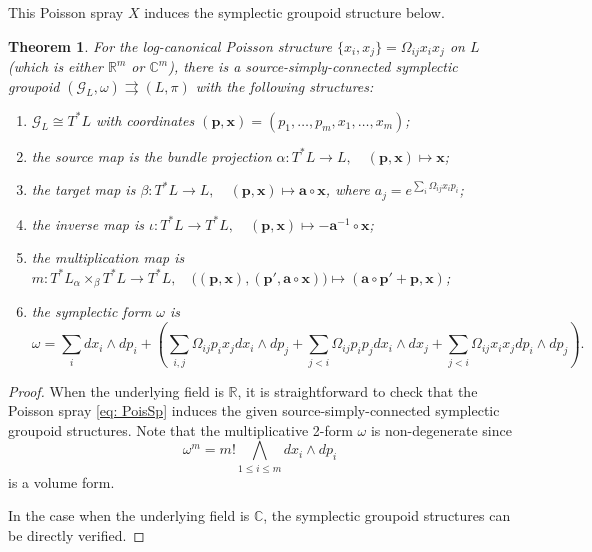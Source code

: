 \documentclass{amsart}
\newtheorem{theorem}{Theorem}[section]
\numberwithin{equation}{section}
\newcommand{\bfa}{\mathbf{a}}
\newcommand{\bfp}{\mathbf{p}}
\newcommand{\bfx}{\mathbf{x}}
\newcommand{\cG}{\mathcal{G}}
\newcommand{\CC}{\mathbb{C}}
\newcommand{\RR}{\mathbb{R}}
\newcommand{\rra}{\rightrightarrows}
\begin{document}
This Poisson spray $X$ induces the symplectic groupoid structure below.
\begin{theorem} 
  \label{thm:PoiSpLogC}
  For the log-canonical Poisson structure $\{x_i, x_j\} = \Omega_{ij} x_i x_j$ on $L$ (which is either $\RR^m$ or $\CC^m$), there is a source-simply-connected symplectic groupoid $(\cG_L, \omega) \rra (L, \pi)$ with the following structures:
  \begin{enumerate}
    \item $\cG_L \cong T^*L$ with coordinates $(\bfp, \bfx) = (p_1, \ldots, p_m, x_1, \ldots, x_m)$;
    \item the source map is the bundle projection $\alpha: T^*L \to L, \quad (\bfp, \bfx) \mapsto \bfx$;
    \item the target map is $\beta: T^*L \to L, \quad (\bfp, \bfx) \mapsto \bfa \circ \bfx$, where $a_j = e^{\sum_i \Omega_{ij} x_ip_i}$;
    \item the inverse map is $\iota: T^*L \to T^*L, \quad (\bfp, \bfx) \mapsto -\bfa^{-1}\circ \bfx$;
    \item the multiplication map is $m: T^*L {_\alpha \times_\beta} T^*L \to T^*L, \quad \big((\bfp, \bfx), (\bfp', \bfa \circ \bfx)\big) \mapsto (\bfa \circ \bfp' + \bfp, \bfx )$;
    \item the symplectic form $\omega$ is
      \begin{equation}
        \label{eq:2-formG_A}
	\omega = \sum_{i} dx_i \wedge dp_i
	  + \left(
	    \sum_{i, j} \Omega_{ij}p_ix_j dx_i \wedge dp_j 
	    + \sum_{j < i} \Omega_{ij}p_ip_j dx_i \wedge dx_j
	    + \sum_{j < i} \Omega_{ij}x_ix_j dp_i \wedge dp_j
	  \right).
      \end{equation}
  \end{enumerate}
\end{theorem}
\begin{proof}
  When the underlying field is $\RR$, it is straightforward to check that the Poisson spray \eqref{eq: PoisSp} induces the given source-simply-connected symplectic groupoid structures.
  Note that the multiplicative 2-form $\omega$ is non-degenerate since
  \[\omega^m = m! \bigwedge\limits_{1\leq i\leq m} dx_i \wedge dp_i\]
  is a volume form.

  In the case when the underlying field is $\CC$, the symplectic groupoid structures can be directly verified.
\end{proof}
\end{document}
